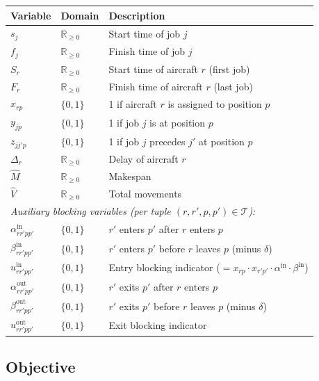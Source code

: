 \begin{center}
\begin{tabular}{lll}
\toprule
Variable & Domain & Description \\
\midrule
$s_j$ & $\mathbb{R}_{\geq 0}$ & Start time of job $j$ \\
$f_j$ & $\mathbb{R}_{\geq 0}$ & Finish time of job $j$ \\
$S_r$ & $\mathbb{R}_{\geq 0}$ & Start time of aircraft $r$ (first job) \\
$F_r$ & $\mathbb{R}_{\geq 0}$ & Finish time of aircraft $r$ (last job) \\
$x_{rp}$ & $\{0,1\}$ & 1 if aircraft $r$ is assigned to position $p$ \\
$y_{jp}$ & $\{0,1\}$ & 1 if job $j$ is at position $p$ \\
$z_{jj'p}$ & $\{0,1\}$ & 1 if job $j$ precedes $j'$ at position $p$ \\
$\Delta_r$ & $\mathbb{R}_{\geq 0}$ & Delay of aircraft $r$ \\
$\hat{M}$ & $\mathbb{R}_{\geq 0}$ & Makespan \\
$\hat{V}$ & $\mathbb{R}_{\geq 0}$ & Total movements \\
\midrule
\multicolumn{3}{l}{\textit{Auxiliary blocking variables (per tuple $(r,r',p,p') \in \mathcal{T}$):}} \\
$\alpha^{\text{in}}_{rr'pp'}$ & $\{0,1\}$ & $r'$ enters $p'$ after $r$ enters $p$ \\
$\beta^{\text{in}}_{rr'pp'}$ & $\{0,1\}$ & $r'$ enters $p'$ before $r$ leaves $p$ (minus $\delta$) \\
$u^{\text{in}}_{rr'pp'}$ & $\{0,1\}$ & Entry blocking indicator ($= x_{rp} \cdot x_{r'p'} \cdot \alpha^{\text{in}} \cdot \beta^{\text{in}}$) \\
$\alpha^{\text{out}}_{rr'pp'}$ & $\{0,1\}$ & $r'$ exits $p'$ after $r$ enters $p$ \\
$\beta^{\text{out}}_{rr'pp'}$ & $\{0,1\}$ & $r'$ exits $p'$ before $r$ leaves $p$ (minus $\delta$) \\
$u^{\text{out}}_{rr'pp'}$ & $\{0,1\}$ & Exit blocking indicator \\
\bottomrule
\end{tabular}
\end{center}

\subsection{Objective}

